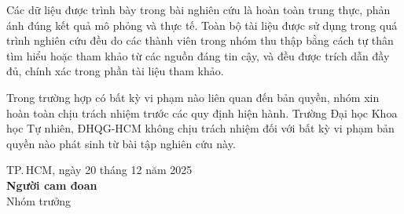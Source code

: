 Các dữ liệu được trình bày trong bài nghiên cứu là hoàn toàn trung thực, phản ánh đúng kết quả mô phỏng và thực tế. Toàn bộ tài liệu được sử dụng trong quá trình nghiên cứu đều do các thành viên trong nhóm thu thập bằng cách tự thân tìm hiểu hoặc tham khảo từ các nguồn đáng tin cậy, và đều được trích dẫn đầy đủ, chính xác trong phần tài liệu tham khảo.

Trong trường hợp có bất kỳ vi phạm nào liên quan đến bản quyền, nhóm xin hoàn toàn chịu trách nhiệm trước các quy định hiện hành. Trường Đại học Khoa học Tự nhiên, ĐHQG-HCM không chịu trách nhiệm đối với bất kỳ vi phạm bản quyền nào phát sinh từ bài tập nghiên cứu này.

\vspace{1cm}
\begin{flushright}
\begin{minipage}{0.45\textwidth}
\centering
TP.\,HCM, ngày 20 tháng 12 năm 2025\\[0.5cm]
\textbf{Người cam đoan}\\
Nhóm trưởng\\[2cm]
\end{minipage}
\end{flushright}
